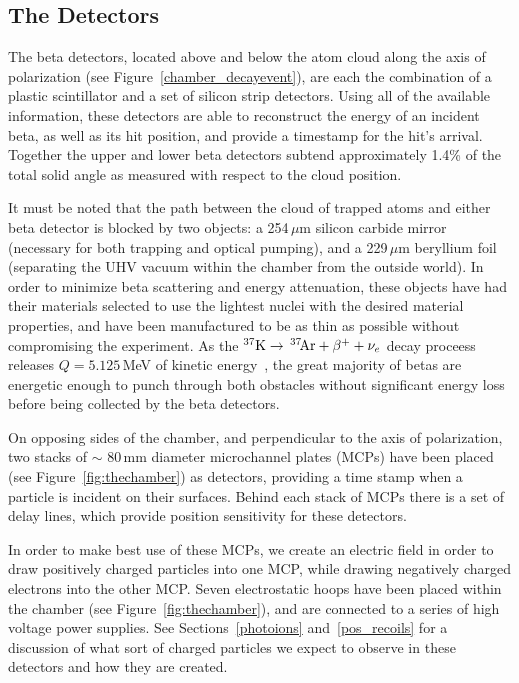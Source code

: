 \subsection{The Detectors}
\label{detectors}
\label{field}
The beta detectors, located above and below the atom cloud along the axis of polarization (see Figure~\ref{chamber_decayevent}), are each the combination of a plastic scintillator and a set of silicon strip detectors.  Using all of the available information, these detectors are able to reconstruct the energy of an incident beta, as well as its hit position, and provide a timestamp for the hit's arrival.  Together the upper and lower beta detectors subtend approximately 1.4\% of the total solid angle as measured with respect to the cloud position. 

It must be noted that the path between the cloud of trapped atoms and either beta detector is blocked by two objects:  a 254$\,\mu$m silicon carbide mirror (necessary for both trapping and optical pumping), and a 229$\,\mu$m beryllium foil (separating the UHV vacuum within the chamber from the outside world).  In order to minimize beta scattering and energy attenuation, these objects have had their materials selected to use the lightest nuclei with the desired material properties, and have been manufactured to be as thin as possible without compromising the experiment.  As the $^{37}\textrm{K} \rightarrow \,^{37}\textrm{\!Ar} + \beta^{+} + \nu_e$ decay proceess releases $Q=5.125$\,MeV of kinetic energy~\cite{Q_value}, the great majority of betas are energetic enough to punch through both obstacles without significant energy loss before being collected by the beta detectors.  

On opposing sides of the chamber, and perpendicular to the axis of polarization, two stacks of $\sim$ 80\,mm diameter microchannel plates (MCPs) have been placed (see Figure~\ref{fig:thechamber}) as detectors, providing a time stamp when a particle is incident on their surfaces.  Behind each stack of MCPs there is a set of delay lines, which provide  position sensitivity for these detectors.   

In order to make best use of these MCPs, we create an electric field in order to draw positively charged particles into one MCP, while drawing negatively charged electrons into the other MCP.  Seven electrostatic hoops have been placed within the chamber (see Figure~\ref{fig:thechamber}), and are connected to a series of high voltage power supplies.  See Sections~\ref{photoions} and~\ref{pos_recoils} for a discussion of what sort of charged particles we expect to observe in these detectors and how they are created.  
  
